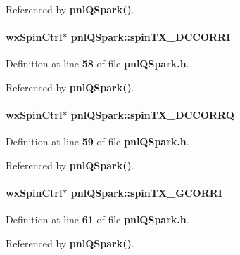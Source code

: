 Referenced by {\bf pnl\+Q\+Spark()}.

\paragraph[{spin\+T\+X\+\_\+\+D\+C\+C\+O\+R\+RI}]{\setlength{\rightskip}{0pt plus 5cm}wx\+Spin\+Ctrl$\ast$ pnl\+Q\+Spark\+::spin\+T\+X\+\_\+\+D\+C\+C\+O\+R\+RI}\label{classpnlQSpark_a7d9eaf050a022602baf610f6fe732d6b}


Definition at line {\bf 58} of file {\bf pnl\+Q\+Spark.\+h}.



Referenced by {\bf pnl\+Q\+Spark()}.

\paragraph[{spin\+T\+X\+\_\+\+D\+C\+C\+O\+R\+RQ}]{\setlength{\rightskip}{0pt plus 5cm}wx\+Spin\+Ctrl$\ast$ pnl\+Q\+Spark\+::spin\+T\+X\+\_\+\+D\+C\+C\+O\+R\+RQ}\label{classpnlQSpark_ade2f526184c154126625f4c6eb1d9722}


Definition at line {\bf 59} of file {\bf pnl\+Q\+Spark.\+h}.



Referenced by {\bf pnl\+Q\+Spark()}.

\paragraph[{spin\+T\+X\+\_\+\+G\+C\+O\+R\+RI}]{\setlength{\rightskip}{0pt plus 5cm}wx\+Spin\+Ctrl$\ast$ pnl\+Q\+Spark\+::spin\+T\+X\+\_\+\+G\+C\+O\+R\+RI}\label{classpnlQSpark_a0610ee66dea5ffa934ea95416b999cd8}


Definition at line {\bf 61} of file {\bf pnl\+Q\+Spark.\+h}.



Referenced by {\bf pnl\+Q\+Spark()}.

